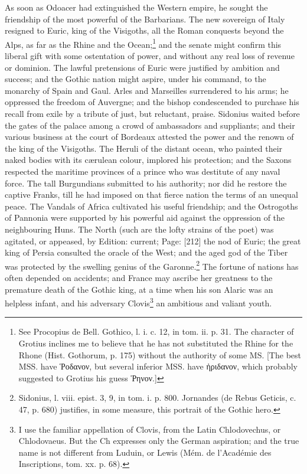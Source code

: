 As soon as Odoacer had extinguished the Western empire, he sought the friendship of the most powerful of the Barbarians. The new sovereign of Italy resigned to Euric, king of the Visigoths, all the Roman conquests beyond the Alps, as far as the Rhine and the Ocean;\footnote{See Procopius de Bell. Gothico, l. i. c. 12, in tom. ii. p. 31. The character of Grotius inclines me to believe that he has not substituted the Rhine for the Rhone (Hist. Gothorum, p. 175) without the authority of some MS. [The best MSS. have \textgreek{\texthebrew{Ῥ}οδανον}, but several inferior MSS. have \textgreek{\texthebrew{ἠ}ριδανον}, which probably suggested to Grotius his guess \textgreek{\texthebrew{Ῥ}ηνον}.]} and the senate might confirm this liberal gift with some ostentation of power, and without any real loss of revenue or dominion. The lawful pretensions of Euric were justified by ambition and success; and the Gothic nation might aspire, under his command, to the monarchy of Spain and Gaul. Arles and Marseilles surrendered to his arms; he oppressed the freedom of Auvergne; and the bishop condescended to purchase his recall from exile by a tribute of just, but reluctant, praise. Sidonius waited before the gates of the palace among a crowd of ambassadors and suppliants; and their various business at the court of Bordeaux attested the power and the renown of the king of the Visigoths. The Heruli of the distant ocean, who painted their naked bodies with its cærulean colour, implored his protection; and the Saxons respected the maritime provinces of a prince who was destitute of any naval force. The tall Burgundians submitted to his authority; nor did he restore the captive Franks, till he had imposed on that fierce nation the terms of an unequal peace. The Vandals of Africa cultivated his useful friendship; and the Ostrogoths of Pannonia were supported by his powerful aid against the oppression of the neighbouring Huns. The North (such are the lofty strains of the poet) was agitated, or appeased, by Edition: current; Page: [212] the nod of Euric; the great king of Persia consulted the oracle of the West; and the aged god of the Tiber was protected by the swelling genius of the Garonne.\footnote{Sidonius, l. viii. epist. 3, 9, in tom. i. p. 800. Jornandes (de Rebus Geticis, c. 47, p. 680) justifies, in some measure, this portrait of the Gothic hero.} The fortune of nations has often depended on accidents; and France may ascribe her greatness to the premature death of the Gothic king, at a time when his son Alaric was an helpless infant, and his adversary Clovis\footnote{I use the familiar appellation of Clovis, from the Latin Chlodovechus, or Chlodovaeus. But the Ch expresses only the German aspiration; and the true name is not different from Luduin, or Lewis (Mém. de l\texthebrew{}’Académie des Inscriptions, tom. xx. p. 68).} an ambitious and valiant youth.

